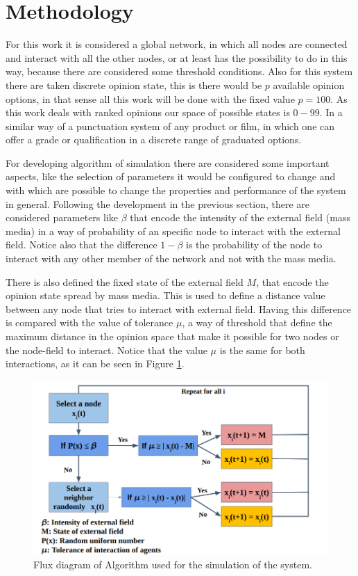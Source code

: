 \documentclass[%
 reprint,
 amsmath,amssymb,
 aps,
]{revtex4-2}
\begin{document}
\section{Methodology}
For this work it is considered a global network, in which all nodes are connected and interact with all the other nodes, or at least has the possibility to do in this way, because there are considered some threshold conditions. Also for this system there are taken discrete opinion state, this is there would be $p$ available opinion options, in that sense all this work will be done with the fixed value $p = 100$. As this work deals with ranked opinions our space of possible states is $0-99$. In a similar way of a punctuation system of any product or film, in which one can offer a grade or qualification in a discrete range of graduated options.

For developing algorithm of simulation there are considered some important aspects, like the selection of parameters it would be configured to change and with which are possible to change the properties and performance of the system in general. Following the development in the previous section, there are considered parameters like $\beta$ that encode the intensity of the external field (mass media) in a way of probability of an specific node to interact with the external field. Notice also that the difference $1 - \beta$ is the probability of the node to interact with any other member of the network and not with the mass media.



There is also defined the fixed state of the external field $M$, that encode the opinion state spread by mass media. This is used to define a distance value between any node that tries to interact with external field. Having this difference is compared with the value of tolerance $\mu$, a way of threshold that define the maximum distance in the opinion space that make it possible for two nodes or the node-field to interact. Notice that the value $\mu$ is the same for both interactions, as it can be seen in Figure \ref{fig:flux_diagram_1}.
\begin{figure}
    \centering
    \includegraphics[width=1\linewidth]{images/Screenshot from 2024-08-21 11-15-28.png}
    \caption{Flux diagram of Algorithm used for the simulation of the system.}
    \label{fig:flux_diagram_1}
\end{figure}
\end{document}
